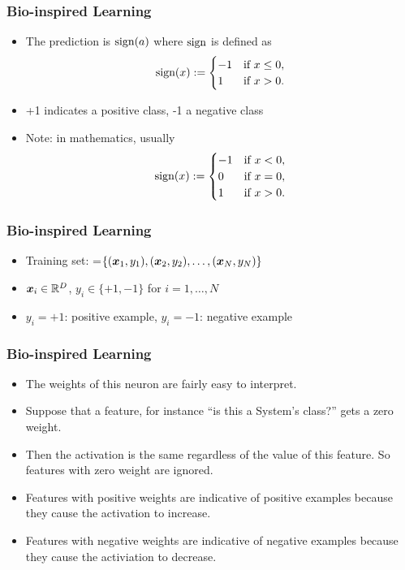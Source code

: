 \documentclass[trans]{beamer}
\begin{document}
\begin{frame}
  \frametitle{Bio-inspired Learning}
\begin{itemize}
\item The prediction is $\textrm{sign}(a)$ where $\textrm{sign}$ is defined as
$$\textrm{sign}(x) := \begin{cases}
-1 & \text{if } x \leq 0, \\
1 & \text{if } x > 0. \end{cases}$$
\item +1 indicates a positive class, -1 a negative class
\item Note: in mathematics, usually
$$\textrm{sign}(x) := \begin{cases}
-1 & \text{if } x < 0, \\
0 & \text{if } x = 0, \\
1 & \text{if } x > 0. \end{cases}$$
\end{itemize}

\end{frame}

\begin{frame}
  \frametitle{Bio-inspired Learning}
\begin{itemize}
\item Training set: =$\{({\boldsymbol{x}}_1,y_1),
({\boldsymbol{x}}_2,y_2), \dots, ({\boldsymbol{x}}_N,y_N)\}$
\item ${\boldsymbol{x}}_i\in \mathbb{R}^D$, $y_i\in \{+1,-1\}$ for $i=1,\ldots,N$
\item $y_i=+1$: positive example, $y_i=-1$: negative example
\end{itemize}

\end{frame}

\begin{frame}
  \frametitle{Bio-inspired Learning}
\begin{itemize}
\item
The weights of this neuron are fairly easy to interpret.
\item  Suppose that
a feature, for instance ``is this a System's class?'' gets a zero
weight. 
\item Then the activation is the same regardless of the value of
this feature.  So features with zero weight are ignored.  
\item Features
with positive weights are indicative of positive examples because they
cause the activation to increase.
\item  Features with negative weights are
indicative of negative examples because they cause the activiation to
decrease.
\end{itemize}
\end{frame}
\end{document}

